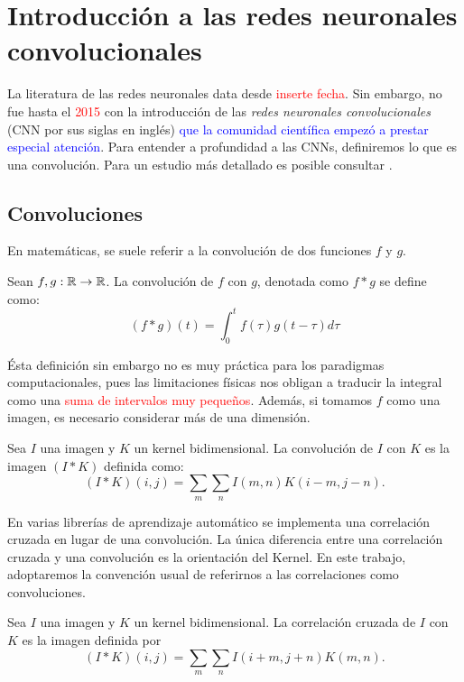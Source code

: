 \chapter{Introducción a las redes neuronales convolucionales}


La literatura de las redes neuronales data desde \textcolor{red}{inserte fecha}. Sin embargo, no fue hasta el \textcolor{red}{2015} con la introducción de las \textsl{redes neuronales convolucionales} (CNN por sus siglas en inglés) \textcolor{blue}{que la comunidad científica empezó a prestar especial atención}. Para entender a profundidad a las CNNs, definiremos lo que es una convolución. Para un estudio más detallado es posible consultar \cite{CNNdefinition,deeplearningbook}. 

\section{Convoluciones}
En matemáticas, se suele referir a la convolución de dos funciones $f$ y $g$.
 \begin{definition}[Convolución]
     Sean $f,g : \mathbb R \to \mathbb R$. La convolución de $f$ con $g$, denotada como $f * g$ se define como:
     $$(f*g)(t) = \int_{0}^t f(\tau)g(t-\tau)d\tau$$
 \end{definition}
 Ésta definición sin embargo no es muy práctica para los paradigmas computacionales, pues  las limitaciones físicas nos obligan a traducir la integral como una \textcolor{red}{suma de intervalos muy pequeños}. Además, si tomamos $f$ como una imagen, es necesario considerar más de una dimensión.
 \begin{definition}
     Sea $I$ una imagen y $K$ un kernel bidimensional. La convolución de $I$ con $K$ es la imagen $(I*K)$ definida como:
     $$(I*K)(i,j) = \sum_m\sum_n I(m,n)K(i-m,j-n).$$ 
 \end{definition}
 En varias librerías de aprendizaje automático se implementa una correlación cruzada en lugar de una convolución. La única diferencia entre una correlación cruzada y una convolución es la orientación del Kernel. En este trabajo, adoptaremos la convención usual de referirnos a las correlaciones como convoluciones.
 \begin{definition}
     Sea $I$ una imagen y $K$ un kernel bidimensional. La correlación cruzada de $I$ con $K$ es la imagen definida por 
     $$(I*K)(i,j) = \sum_m\sum_n I(i+m,j+n)K(m,n).$$ 
 \end{definition} 

